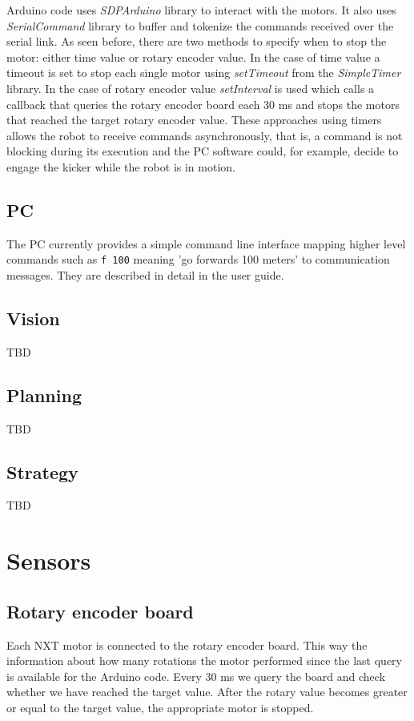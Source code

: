 \documentclass[12pt]{article}
\begin{document}
Arduino code uses \textit{SDPArduino} library to interact with the motors.
It also uses \textit{SerialCommand} library to buffer and tokenize the
commands received over the serial link. As seen before, there are two methods to
specify when to stop the motor: either time value or rotary encoder value.
In the case of time value a timeout is set to stop each single motor using
\textit{setTimeout} from the \textit{SimpleTimer} library.
In the case of rotary encoder value \textit{setInterval} is used which calls
a callback that queries the rotary encoder board each 30 ms and stops the motors
that reached the target rotary encoder value. These approaches using timers
allows the robot to receive commands asynchronously, that is, a command is not
blocking during its execution and the PC software could, for example, decide
to engage the kicker while the robot is in motion.

\subsection{PC}

The PC currently provides a simple command line interface mapping higher level
commands such as \texttt{f 100} meaning 'go forwards 100 meters' to
communication messages. They are described in detail in the user guide.

\subsection{Vision}

TBD

\subsection{Planning}

TBD

\subsection{Strategy}

TBD

\section{Sensors}
\subsection{Rotary encoder board}

Each NXT motor is connected to the rotary encoder board. This way the
information about how many rotations the motor performed since the last query
is available for the Arduino code. Every 30 ms we query the board and
check whether we have reached the target value. After the rotary value becomes
greater or equal to the target value, the appropriate motor is stopped.
\end{document}
